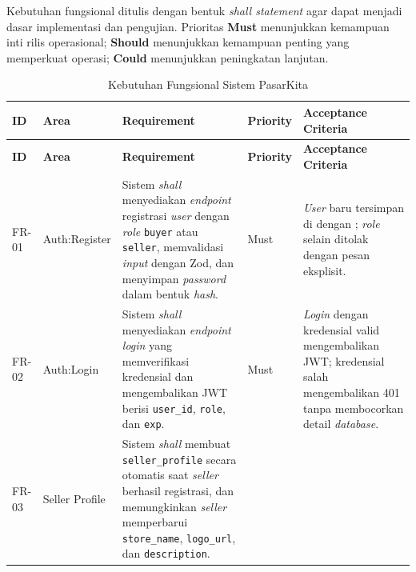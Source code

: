 
Kebutuhan fungsional ditulis dengan bentuk \textit{shall statement} agar dapat
menjadi dasar implementasi dan pengujian. Prioritas \textbf{Must} menunjukkan
kemampuan inti rilis operasional; \textbf{Should} menunjukkan kemampuan penting
yang memperkuat operasi; \textbf{Could} menunjukkan peningkatan lanjutan.

\begin{longtable}{|L{0.9cm}|L{2.7cm}|L{5.5cm}|L{1.3cm}|L{4.6cm}|}
    \caption{Kebutuhan Fungsional Sistem PasarKita}
    \label{tab:functional-req} \\
    \hline
    \textbf{ID} & \textbf{Area} & \textbf{Requirement} & \textbf{Priority}
        & \textbf{Acceptance Criteria} \\
    \hline
    \endfirsthead
    \hline
    \textbf{ID} & \textbf{Area} & \textbf{Requirement} & \textbf{Priority}
        & \textbf{Acceptance Criteria} \\
    \hline
    \endhead
    \hline
    \endfoot
    FR-01
        & Auth:\newline Register
        & Sistem \textit{shall} menyediakan \textit{endpoint} registrasi
          \textit{user} dengan \textit{role} \texttt{buyer} atau \texttt{seller},
          memvalidasi \textit{input} dengan Zod, dan menyimpan \textit{password}
          dalam bentuk \textit{hash}.
        & Must
        & \textit{User} baru tersimpan di  dengan
          ; \textit{role} selain 
          ditolak dengan pesan eksplisit. \\
    \hline
    FR-02
        & Auth:\newline Login
        & Sistem \textit{shall} menyediakan \textit{endpoint} \textit{login} yang
          memverifikasi kredensial dan mengembalikan JWT berisi \texttt{user\_id},
          \texttt{role}, dan \texttt{exp}.
        & Must
        & \textit{Login} dengan kredensial valid mengembalikan JWT; kredensial
          salah mengembalikan 401 tanpa membocorkan detail \textit{database}. \\
    \hline
    FR-03
        & Seller Profile
        & Sistem \textit{shall} membuat \texttt{seller\_profile} secara otomatis
          saat \textit{seller} berhasil registrasi, dan memungkinkan \textit{seller}
          memperbarui \texttt{store\_name}, \texttt{logo\_url}, dan
          \texttt{description}.

\end{longtable}
